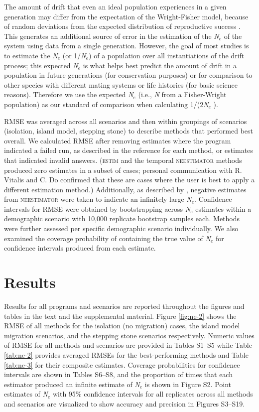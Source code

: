 The amount of drift that even an ideal population experiences in a given generation may 
differ from the expectation of the Wright-Fisher model, because of random deviations from 
the expected distribution of reproductive success \citep{Waples:2009}. This generates 
an additional source of error in the estimation of the \emph{N}$_e$ of the system using 
data from a single generation. However, the goal of most studies is to estimate the \emph{N}$_e$ 
(or 1/\emph{N}$_e$) of a population over all instantiations of the drift process; this expected 
\emph{N}$_e$ is what helps best predict the amount of drift in a population in future generations 
(for conservation purposes) or for comparison to other species with different mating systems or 
life histories (for basic science reasons). Therefore we use the expected \emph{N}$_e$ 
(i.e., \emph{N} from a Fisher-Wright population) as our standard of comparison when calculating 1/(2\emph{N}$_e$ ).

RMSE was averaged across all scenarios and then within groupings of scenarios 
(isolation, island model, stepping stone) to describe methods that performed best overall. 
We calculated RMSE after removing estimates where the program indicated a failed run, as 
described in the reference for each method, or estimates that indicated invalid answers. (\textsc{estim} and the
temporal \textsc{neestimator} methods produced zero estimates in a subset of cases; 
personal communication with R. Vitalis and C. Do confirmed that these are cases where the 
user is best to apply a different estimation method.) Additionally, as described by \citet{Do:2014}, 
negative estimates from \textsc{neestimator} were taken to indicate an infinitely large \emph{N}$_e$. 
Confidence intervals for RMSE were obtained by bootstrapping across \emph{N}$_e$ estimates within a 
demographic scenario with 10,000 replicate bootstrap samples each. Methods were further assessed per 
specific demographic scenario individually. We also examined the coverage probability of containing 
the true value of \emph{N}$_e$ for confidence intervals produced from each estimate.

\section{Results}
Results for all programs and scenarios are reported throughout the figures and tables in the text 
and the supplemental material. Figure \ref{fig:ne-2} shows the RMSE of all methods for the isolation (no migration) 
cases, the island model migration scenarios, and the stepping stone scenarios respectively. Numeric 
values of RMSE for all methods and scenarios are provided in Tables S1--S5 while Table \ref{tab:ne-2} provides 
averaged RMSEs for the best-performing methods and Table \ref{tab:ne-3} for their composite estimates. 
Coverage probabilities for confidence intervals are shown in Tables S6--S8, and the proportion 
of times that each estimator produced an infinite estimate of \emph{N}$_e$ is shown in Figure S2. 
Point estimates of \emph{N}$_e$ with 95\% confidence intervals for all replicates across all 
methods and scenarios are visualized to show accuracy and precision in Figures S3--S19.

